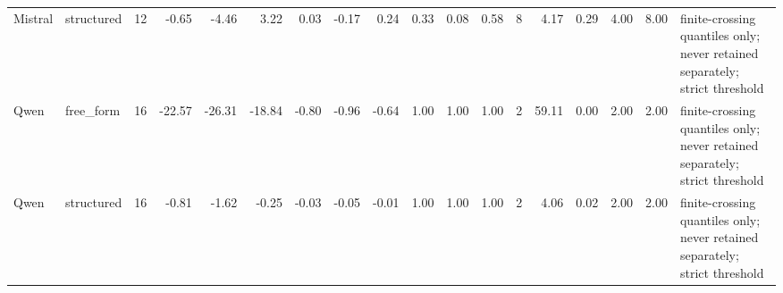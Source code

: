 \begin{tabular}{llrrrrrrrrrrlrrrrl}
Mistral & structured & 12 & -0.65 & -4.46 & 3.22 & 0.03 & -0.17 & 0.24 & 0.33 & 0.08 & 0.58 & 8 & 4.17 & 0.29 & 4.00 & 8.00 & finite-crossing quantiles only; never retained separately; strict threshold \\
Qwen & free\_form & 16 & -22.57 & -26.31 & -18.84 & -0.80 & -0.96 & -0.64 & 1.00 & 1.00 & 1.00 & 2 & 59.11 & 0.00 & 2.00 & 2.00 & finite-crossing quantiles only; never retained separately; strict threshold \\
Qwen & structured & 16 & -0.81 & -1.62 & -0.25 & -0.03 & -0.05 & -0.01 & 1.00 & 1.00 & 1.00 & 2 & 4.06 & 0.02 & 2.00 & 2.00 & finite-crossing quantiles only; never retained separately; strict threshold \\
\bottomrule
\end{tabular}
